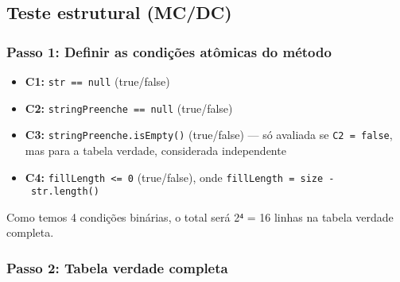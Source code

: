 \documentclass[
  letterpaper,
  DIV=11,
  numbers=noendperiod]{scrartcl}
\providecommand{\tightlist}{%
  \setlength{\itemsep}{0pt}\setlength{\parskip}{0pt}}
\begin{document}
\subsection{Teste estrutural (MC/DC)}\label{teste-estrutural-mcdc}

\subsubsection{Passo 1: Definir as condições atômicas do
método}\label{passo-1-definir-as-condiuxe7uxf5es-atuxf4micas-do-muxe9todo}

\begin{itemize}
\tightlist
\item
  \textbf{C1:} \texttt{str\ ==\ null} (true/false)\\
\item
  \textbf{C2:} \texttt{stringPreenche\ ==\ null} (true/false)\\
\item
  \textbf{C3:} \texttt{stringPreenche.isEmpty()} (true/false) --- só
  avaliada se \texttt{C2\ =\ false}, mas para a tabela verdade,
  considerada independente\\
\item
  \textbf{C4:} \texttt{fillLength\ \textless{}=\ 0} (true/false), onde
  \texttt{fillLength\ =\ size\ -\ str.length()}
\end{itemize}

Como temos 4 condições binárias, o total será 2⁴ = 16 linhas na tabela
verdade completa.

\subsubsection{Passo 2: Tabela verdade
completa}\label{passo-2-tabela-verdade-completa}
\end{document}
